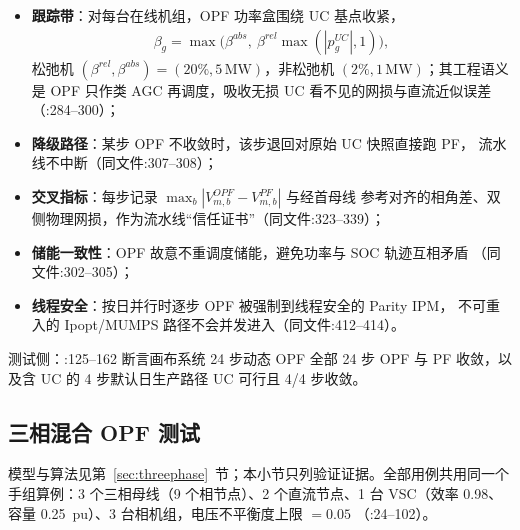 \begin{itemize}
  \item \textbf{跟踪带}：对每台在线机组，OPF 功率盒围绕 UC 基点收紧，
        \begin{align*}
        \beta_g=\max\bigl(\beta^{abs},\ \beta^{rel}\max(|p^{UC}_g|,1)\bigr),
        \end{align*}
        松弛机 $(\beta^{rel},\beta^{abs})=(20\%,5\,\mathrm{MW})$，非松弛机
        $(2\%,1\,\mathrm{MW})$；其工程语义是 OPF 只作类 AGC 再调度，吸收无损 UC
        看不见的网损与直流近似误差（:284--300）；
  \item \textbf{降级路径}：某步 OPF 不收敛时，该步退回对原始 UC 快照直接跑 PF，
        流水线不中断（同文件:307--308）；
  \item \textbf{交叉指标}：每步记录 $\max_b|V_{m,b}^{OPF}-V_{m,b}^{PF}|$ 与经首母线
        参考对齐的相角差、双侧物理网损，作为流水线“信任证书”（同文件:323--339）；
  \item \textbf{储能一致性}：OPF 故意不重调度储能，避免功率与 SOC 轨迹互相矛盾
        （同文件:302--305）；
  \item \textbf{线程安全}：按日并行时逐步 OPF 被强制到线程安全的 Parity IPM，
        不可重入的 Ipopt/MUMPS 路径不会并发进入（同文件:412--414）。
\end{itemize}

测试侧：:125--162 断言画布系统 24 步动态
OPF 全部 24 步 OPF 与 PF 收敛，以及含 UC 的 4 步默认日生产路径 UC 可行且
4/4 步收敛。

\subsection{三相混合 OPF 测试}\label{subsec:ver:threephase}

模型与算法见第~\ref{sec:threephase}~节；本小节只列验证证据。全部用例共用同一个
手组算例：3 个三相母线（9 个相节点）、2 个直流节点、1 台 VSC（效率 0.98、容量
0.25~pu）、3 台相机组，电压不平衡度上限 $=0.05$
（:24--102）。

